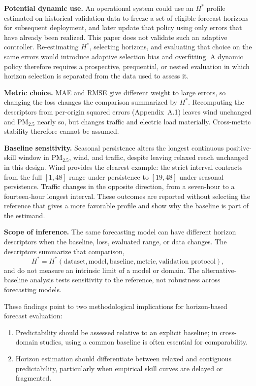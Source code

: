 \documentclass[pdflatex]{sn-jnl}
\begin{document}
\textbf{Potential dynamic use.} An operational system could use an $H^*$
profile estimated on historical validation data to freeze a set of eligible
forecast horizons for subsequent deployment, and later update that policy
using only errors that have already been realized. This paper does not
validate such an adaptive controller. Re-estimating $H^*$, selecting horizons,
and evaluating that choice on the same errors would introduce adaptive
selection bias and overfitting. A dynamic policy therefore requires a
prospective, prequential, or nested evaluation in which horizon selection is
separated from the data used to assess it.

\textbf{Metric choice.} MAE and RMSE give different weight to large errors,
so changing the loss changes the comparison summarized by $H^*$. Recomputing
the descriptors from per-origin squared errors (Appendix~A.1) leaves wind
unchanged and PM$_{2.5}$ nearly so, but changes traffic and electric load
materially. Cross-metric stability therefore cannot be assumed.

\textbf{Baseline sensitivity.} Seasonal persistence alters the longest
continuous positive-skill window in PM$_{2.5}$, wind, and traffic, despite
leaving relaxed reach unchanged in this design. Wind provides the clearest
example: the strict interval contracts from the full $[1,48]$ range under
persistence to $[19,48]$ under seasonal persistence. Traffic changes in the
opposite direction, from a seven-hour to a fourteen-hour longest interval.
These outcomes are reported without selecting the reference that gives a more
favorable profile and show why the baseline is part of the estimand.

\textbf{Scope of inference.} The same forecasting model can have different
horizon descriptors when the baseline, loss, evaluated range, or data
changes. The descriptors summarize that comparison,
\[
H^* = H^*(\text{dataset}, \text{model}, \text{baseline}, \text{metric}, \text{validation protocol}),
\]
and do not measure an intrinsic limit of a model or domain. The alternative-baseline analysis
tests sensitivity to the reference, not robustness across forecasting models.

These findings point to two methodological implications for horizon-based forecast evaluation:
\begin{enumerate}
  \item Predictability should be assessed relative to an explicit baseline; in cross-domain studies, using a common baseline is often essential for comparability.
  \item Horizon estimation should differentiate between relaxed and contiguous predictability, particularly when empirical skill curves are delayed or fragmented.
\end{enumerate}
\end{document}
